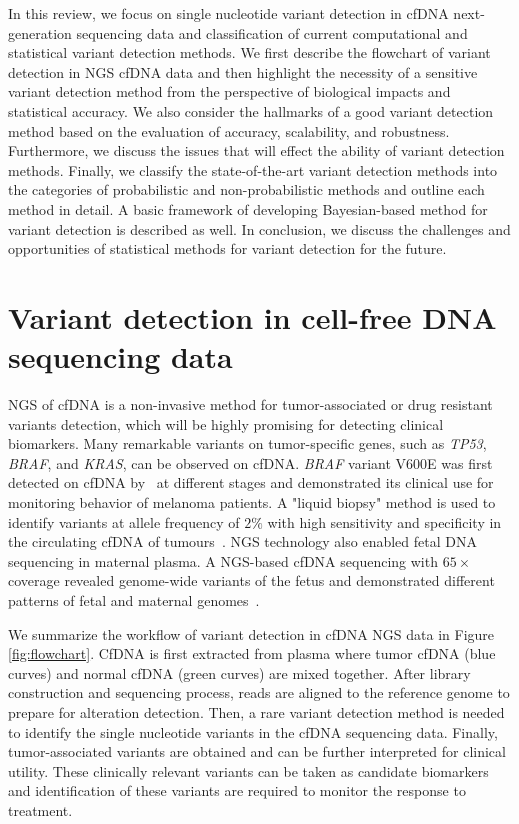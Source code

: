 \documentclass[a4,center,fleqn]{NAR}
\begin{document}
In this review, we focus on single nucleotide variant detection in cfDNA next-generation sequencing data and classification of current computational and statistical variant detection methods.
We first describe the flowchart of variant detection in NGS cfDNA data and then highlight the necessity of a sensitive variant detection method from the perspective of biological impacts and statistical accuracy.
We also consider the hallmarks of a good variant detection method based on the evaluation of accuracy, scalability, and robustness.
Furthermore, we discuss the issues that will effect the ability of variant detection methods.
Finally, we classify the state-of-the-art variant detection methods into the categories of probabilistic and non-probabilistic methods and outline each method in detail.
A basic framework of developing Bayesian-based method for variant detection is described as well.
In conclusion, we discuss the challenges and opportunities of statistical methods for variant detection for the future.

\clearpage

\section{Variant detection in cell-free DNA sequencing data}

NGS of cfDNA is a non-invasive method for tumor-associated or drug resistant variants detection, which will be highly promising for detecting clinical biomarkers. 
Many remarkable variants on tumor-specific genes, such as \textit{TP53}, \textit{BRAF}, and \textit{KRAS}, can be observed on cfDNA.
\textit{BRAF} variant V600E was first detected on cfDNA by~\citep{shinozaki2007utility} at different stages and demonstrated its clinical use for monitoring behavior of melanoma patients.
A "liquid biopsy" method is used to identify variants at allele frequency of $2\%$ with high sensitivity and specificity in the circulating cfDNA of tumours~\citep{forshew2012noninvasive}.
NGS technology also enabled fetal DNA sequencing in maternal plasma.
A NGS-based cfDNA sequencing with $65\times$ coverage revealed genome-wide variants of the fetus and demonstrated different patterns of fetal and maternal genomes~\citep{lo2010maternal}.

We summarize the workflow of variant detection in cfDNA NGS data in Figure \ref{fig:flowchart}.
CfDNA is first extracted from plasma where tumor cfDNA (blue curves) and normal cfDNA (green curves) are mixed together.
After library construction and sequencing process, reads are aligned to the reference genome to prepare for alteration detection.
Then, a rare variant detection method is needed to identify the single nucleotide variants in the cfDNA sequencing data.
Finally, tumor-associated variants are obtained and can be further interpreted for clinical utility.
These clinically relevant variants can be taken as candidate biomarkers and identification of these variants are required to monitor the response to treatment.
\end{document}
